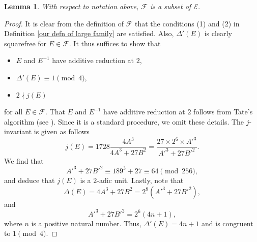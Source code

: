 \documentclass[12pt]{amsart}
\newtheorem{lemma}[theorem]{Lemma}
\newcommand{\cF}{\mathcal{F}}
\newcommand{\cE}{\mathcal{E}}
\numberwithin{equation}{section}
\begin{document}
\begin{lemma}\label{F is subset of E}
    With respect to notation above, $\cF$ is a subset of $\cE$. 
\end{lemma}
\begin{proof}
    It is clear from the definition of $\cF$ that the conditions (1) and (2) in Definition \ref{our defn of large family} are satisfied. Also, $\Delta'(E)$ is clearly squarefree for $E\in \cF$. It thus suffices to show that
    \begin{itemize}
        \item $E$ and $E^{-1}$ have additive reduction at $2$, 
        \item $\Delta'(E)\equiv 1\pmod{4}$, 
        \item $2\nmid j(E)$
    \end{itemize}
     for all $E\in \cF$. That $E$ and $E^{-1}$ have additive reduction at $2$ follows from Tate's algorithm (see \cite[step 7, p. 367]{SilvermanAdvancedtopics}). Since it is a standard procedure, we omit these details. The $j$-invariant is given as follows
\[
j(E) = 1728 \frac{4 A^3}{4A^3 + 27B^2} = \frac{27 \times 2^{6} \times A'^3}{A'^3 + 27 B'^2}.
\]
We find that
\[
A'^3 + 27 B'^2 \equiv 189^3 + 27 \equiv 64 \pmod{256},
\]
and deduce that $j(E)$ is a $2$-adic unit. Lastly, note that
\[\Delta(E) = 4 A^3 + 27 B^2 = 2^8 (A'^3 + 27 B'^2),\]
and
\[A'^3 + 27 B'^2 = 2^6 (4n + 1),\]
where $n$ is a positive natural number. Thus, $\Delta'(E)=4n+1$ and is congruent to $1\pmod{4}$.
\end{proof}
\end{document}
